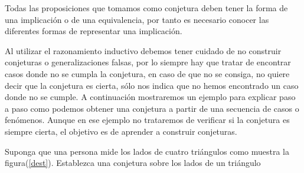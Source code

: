 Todas las proposiciones que tomamos como conjetura deben tener la
forma de una implicación o de una equivalencia, por tanto es necesario
conocer las diferentes formas de representar una implicación.

\obs Al utilizar el razonamiento inductivo debemos tener cuidado
de no construir conjeturas o generalizaciones falsas, por lo siempre
hay que tratar de encontrar casos donde no se cumpla la conjetura,
en caso de que no se consiga, no quiere decir que la conjetura es
cierta, sólo nos indica que no hemos encontrado un caso donde no se
cumple. A continuación mostraremos un ejemplo para explicar paso a
paso como podemos obtener una conjetura a partir de una secuencia
de casos o fenómenos. Aunque en ese ejemplo no trataremos de verificar
si la conjetura es siempre cierta, el objetivo es de aprender a construir
conjeturas. 

\begin{ejemplo} Suponga que una persona mide los lados de cuatro
triángulos como muestra la figura(\ref{dest}). Establezca una conjetura
sobre los lados de un triángulo

\end{ejemplo}

